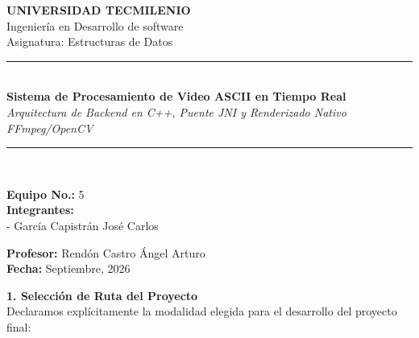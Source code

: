 \documentclass[12pt]{article}
\begin{document}
\begin{center}
    \vspace*{1.5cm}
    {\Huge \bfseries UNIVERSIDAD TECMILENIO} \\[0.5cm]
    {\huge Ingeniería en Desarrollo de software} \\[0.5cm]
    {\Large Asignatura: Estructuras de Datos} \\[1.5cm]
    
    \rule{0.8\linewidth}{0.8mm} \\[0.6cm]
    {\Huge \bfseries Sistema de Procesamiento de Video ASCII en Tiempo Real} \\[0.4cm]
    {\Large \itshape Arquitectura de Backend en C++, Puente JNI y Renderizado Nativo FFmpeg/OpenCV} \\[0.6cm]
    \rule{0.8\linewidth}{0.8mm} \\[1.5cm]
    
    \begin{minipage}{0.4\textwidth}
        \begin{flushleft} \Large
            \textbf{Equipo No.:} 5 \\[0.2cm]
            \textbf{Integrantes:} \\
            - García Capistrán José Carlos
        \end{flushleft}
    \end{minipage}
    \hfill
    \begin{minipage}{0.4\textwidth}
        \begin{flushright} \Large
            \textbf{Profesor:} Rendón Castro Ángel Arturo \\[0.2cm]
            \textbf{Fecha:} Septiembre, 2026
        \end{flushright}
    \end{minipage}
\end{center}

\newpage

\raggedright
{\Huge \bfseries 1. Selección de Ruta del Proyecto}\\[1cm]

\Large
Declaramos explícitamente la modalidad elegida para el desarrollo del proyecto final:
\end{document}
